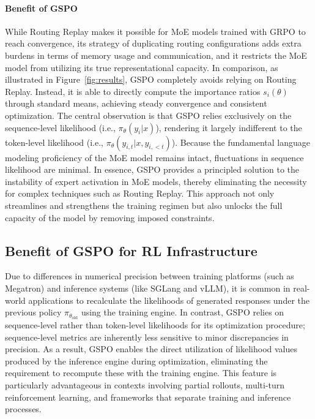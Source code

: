 \paragraph{Benefit of GSPO} While Routing Replay makes it possible for MoE models trained with GRPO to reach convergence, its strategy of duplicating routing configurations adds extra burdens in terms of memory usage and communication, and it restricts the MoE model from utilizing its true representational capacity. In comparison, as illustrated in Figure~\ref{fig:results}, GSPO completely avoids relying on Routing Replay. Instead, it is able to directly compute the importance ratios $s_i(\theta)$ through standard means, achieving steady convergence and consistent optimization. The central observation is that GSPO relies exclusively on the sequence-level likelihood (i.e., $\pi_{\theta} (y_i | x)$), rendering it largely indifferent to the token-level likelihood (i.e., $\pi_{\theta} (y_{i,t} | x, y_{i,<t})$). Because the fundamental language modeling proficiency of the MoE model remains intact, fluctuations in sequence likelihood are minimal. In essence, GSPO provides a principled solution to the instability of expert activation in MoE models, thereby eliminating the necessity for complex techniques such as Routing Replay. This approach not only streamlines and strengthens the training regimen but also unlocks the full capacity of the model by removing imposed constraints.

\subsection{Benefit of GSPO for RL Infrastructure}

Due to differences in numerical precision between training platforms (such as Megatron) and inference systems (like SGLang and vLLM), it is common in real-world applications to recalculate the likelihoods of generated responses under the previous policy $\pi_{\theta_\text{old}}$ using the training engine. In contrast, GSPO relies on sequence-level rather than token-level likelihoods for its optimization procedure; sequence-level metrics are inherently less sensitive to minor discrepancies in precision. As a result, GSPO enables the direct utilization of likelihood values produced by the inference engine during optimization, eliminating the requirement to recompute these with the training engine. This feature is particularly advantageous in contexts involving partial rollouts, multi-turn reinforcement learning, and frameworks that separate training and inference processes.


